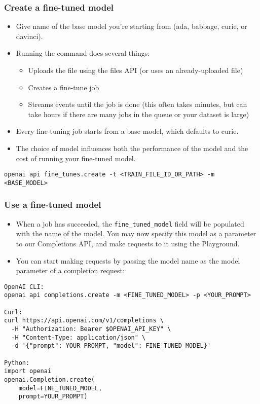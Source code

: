 \begin{frame}[fragile]\frametitle{Create a fine-tuned model}

\begin{itemize}
\item Give name of the base model you're starting from (ada, babbage, curie, or davinci).
\item Running the command does several things:
	\begin{itemize}
	\item Uploads the file using the files API (or uses an already-uploaded file)
	\item Creates a fine-tune job
	\item Streams events until the job is done (this often takes minutes, but can take hours if there are many jobs in the queue or your dataset is large)
	\end{itemize}	 
\item Every fine-tuning job starts from a base model, which defaults to curie. 
\item The choice of model influences both the performance of the model and the cost of running your fine-tuned model.
\end{itemize}	 

\begin{lstlisting}
openai api fine_tunes.create -t <TRAIN_FILE_ID_OR_PATH> -m <BASE_MODEL>
\end{lstlisting}	

\end{frame}


\begin{frame}[fragile]\frametitle{Use a fine-tuned model}

\begin{itemize}
\item When a job has succeeded, the \lstinline|fine_tuned_model| field will be populated with the name of the model. You may now specify this model as a parameter to our Completions API, and make requests to it using the Playground.
\item You can start making requests by passing the model name as the model parameter of a completion request:
\end{itemize}	 

\begin{lstlisting}
OpenAI CLI:
openai api completions.create -m <FINE_TUNED_MODEL> -p <YOUR_PROMPT>

Curl:
curl https://api.openai.com/v1/completions \
  -H "Authorization: Bearer $OPENAI_API_KEY" \
  -H "Content-Type: application/json" \
  -d '{"prompt": YOUR_PROMPT, "model": FINE_TUNED_MODEL}'

Python:	
import openai
openai.Completion.create(
    model=FINE_TUNED_MODEL,
    prompt=YOUR_PROMPT)
		
\end{lstlisting}	
		
\end{frame}

